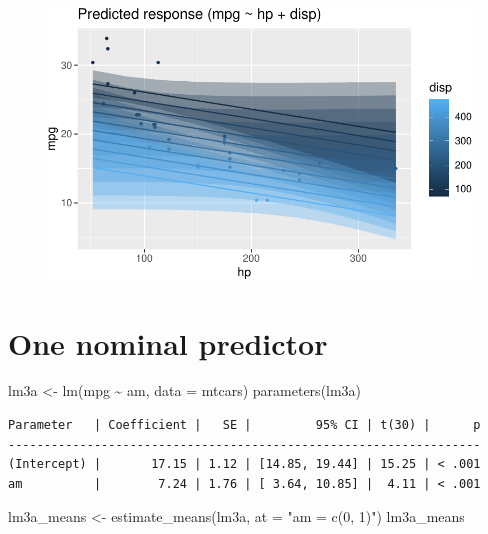 \documentclass[
  letterpaper,
  DIV=11,
  numbers=noendperiod]{scrreprt}
\newenvironment{Shaded}{\begin{snugshade}}{\end{snugshade}}
\newcommand{\AttributeTok}[1]{\textcolor[rgb]{0.40,0.45,0.13}{#1}}
\newcommand{\FunctionTok}[1]{\textcolor[rgb]{0.28,0.35,0.67}{#1}}
\newcommand{\NormalTok}[1]{\textcolor[rgb]{0.00,0.23,0.31}{#1}}
\newcommand{\OtherTok}[1]{\textcolor[rgb]{0.00,0.23,0.31}{#1}}
\newcommand{\SpecialCharTok}[1]{\textcolor[rgb]{0.37,0.37,0.37}{#1}}
\newcommand{\StringTok}[1]{\textcolor[rgb]{0.13,0.47,0.30}{#1}}
\theoremstyle{definition}
\theoremstyle{definition}
\theoremstyle{remark}
\begin{document}
\begin{figure}[H]

{\centering \includegraphics{./regression1_files/figure-pdf/lm2-pred-1.pdf}

}

\end{figure}

\hypertarget{one-nominal-predictor}{%
\section{One nominal predictor}\label{one-nominal-predictor}}

\begin{Shaded}
\begin{Highlighting}[]
\NormalTok{lm3a }\OtherTok{\textless{}{-}} \FunctionTok{lm}\NormalTok{(mpg }\SpecialCharTok{\textasciitilde{}}\NormalTok{ am, }\AttributeTok{data =}\NormalTok{ mtcars)}
\FunctionTok{parameters}\NormalTok{(lm3a)}
\end{Highlighting}
\end{Shaded}

\begin{verbatim}
Parameter   | Coefficient |   SE |         95% CI | t(30) |      p
------------------------------------------------------------------
(Intercept) |       17.15 | 1.12 | [14.85, 19.44] | 15.25 | < .001
am          |        7.24 | 1.76 | [ 3.64, 10.85] |  4.11 | < .001
\end{verbatim}

\begin{Shaded}
\begin{Highlighting}[]
\NormalTok{lm3a\_means }\OtherTok{\textless{}{-}} \FunctionTok{estimate\_means}\NormalTok{(lm3a, }\AttributeTok{at =} \StringTok{"am = c(0, 1)"}\NormalTok{)}
\NormalTok{lm3a\_means }
\end{Highlighting}
\end{Shaded}
\end{document}
